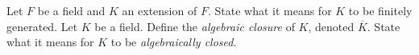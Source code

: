 \documentclass{exam}
\begin{document}
\begin{center}
\end{center}
\vspace*{1em}
\begin{questions}
    \question[2]
        Let $F$ be a field and $K$ an extension of $F$. State what it means for $K$ to be finitely generated.
        \vspace*{10cm}
    \question[3]
        Let $K$ be a field. Define the \textit{algebraic closure} of $K$, denoted $\overline{K}$. State what it means for $K$ to be \textit{algebraically closed}.
\end{questions}
\end{document}
